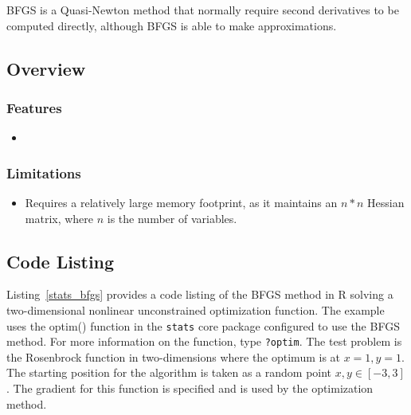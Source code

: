 BFGS is a Quasi-Newton method that normally require second derivatives to be computed directly, although BFGS is able to make approximations.

\subsection{Overview}

\subsubsection{Features}

\begin{itemize}
	\item 
\end{itemize}

\subsubsection{Limitations}

\begin{itemize}
	\item Requires a relatively large memory footprint, as it maintains an $n*n$ Hessian matrix, where $n$ is the number of variables.
\end{itemize}


\subsection{Code Listing}
Listing~\ref{stats_bfgs} provides a code listing of the BFGS method in R solving a two-dimensional nonlinear unconstrained optimization function.
The example uses the {optim()} function in the \texttt{stats} core package configured to use the BFGS method. For more information on the function, type \texttt{?optim}.
The test problem is the Rosenbrock function in two-dimensions where the optimum is at $x=1, y=1$. The starting position for the algorithm is taken as a random point $x,y \in [-3,3]$. The gradient for this function is specified and is used by the optimization method.




